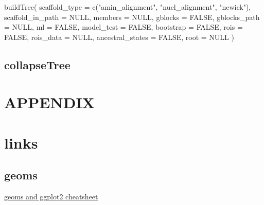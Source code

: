 \documentclass[
]{krantz}
\newenvironment{Shaded}{\begin{snugshade}}{\end{snugshade}}
\newcommand{\AttributeTok}[1]{\textcolor[rgb]{0.77,0.63,0.00}{#1}}
\newcommand{\ConstantTok}[1]{\textcolor[rgb]{0.00,0.00,0.00}{#1}}
\newcommand{\FunctionTok}[1]{\textcolor[rgb]{0.00,0.00,0.00}{#1}}
\newcommand{\NormalTok}[1]{#1}
\newcommand{\StringTok}[1]{\textcolor[rgb]{0.31,0.60,0.02}{#1}}
\begin{document}
\begin{Shaded}
\begin{Highlighting}[]
\FunctionTok{buildTree}\NormalTok{(}
  \AttributeTok{scaffold\_type =} \FunctionTok{c}\NormalTok{(}\StringTok{"amin\_alignment"}\NormalTok{, }\StringTok{"nucl\_alignment"}\NormalTok{, }\StringTok{"newick"}\NormalTok{),}
  \AttributeTok{scaffold\_in\_path =} \ConstantTok{NULL}\NormalTok{,}
  \AttributeTok{members =} \ConstantTok{NULL}\NormalTok{,}
  \AttributeTok{gblocks =} \ConstantTok{FALSE}\NormalTok{, }
  \AttributeTok{gblocks\_path =} \ConstantTok{NULL}\NormalTok{,}
  \AttributeTok{ml =} \ConstantTok{FALSE}\NormalTok{, }
  \AttributeTok{model\_test =} \ConstantTok{FALSE}\NormalTok{,}
  \AttributeTok{bootstrap =} \ConstantTok{FALSE}\NormalTok{,}
  \AttributeTok{rois =} \ConstantTok{FALSE}\NormalTok{, }
  \AttributeTok{rois\_data =} \ConstantTok{NULL}\NormalTok{,}
  \AttributeTok{ancestral\_states =} \ConstantTok{FALSE}\NormalTok{,}
  \AttributeTok{root =} \ConstantTok{NULL}
\NormalTok{)}
\end{Highlighting}
\end{Shaded}

\hypertarget{collapsetree}{%
\subsection{collapseTree}\label{collapsetree}}

\hypertarget{section-5}{%
\section*{}\label{section-5}}

\hypertarget{appendix}{%
\section*{APPENDIX}\label{appendix}}

\hypertarget{links}{%
\section{links}\label{links}}

\hypertarget{geoms-1}{%
\subsection{geoms}\label{geoms-1}}

\href{https://thebustalab.github.io/R_For_Chemists_3/images/ggplot2_geoms.pdf}{geoms and ggplot2 cheatsheet}
\end{document}
